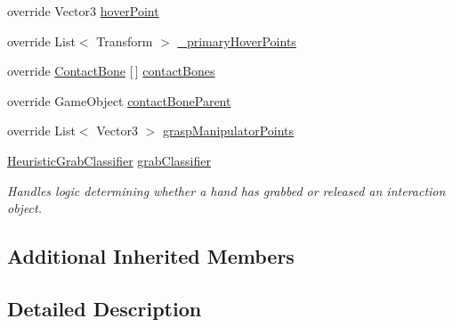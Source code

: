 \begin{DoxyCompactItemize}
override Vector3 \mbox{\hyperlink{class_leap_1_1_unity_1_1_interaction_1_1_interaction_hand_a0f241a7ebea2f55c68666273fe5eda39}{hover\+Point}}
\item 
override List$<$ Transform $>$ \mbox{\hyperlink{class_leap_1_1_unity_1_1_interaction_1_1_interaction_hand_a61394986b5c5dcd7ead304d389e86db7}{\+\_\+primary\+Hover\+Points}}
\item 
override \mbox{\hyperlink{class_leap_1_1_unity_1_1_interaction_1_1_contact_bone}{Contact\+Bone}} \mbox{[}$\,$\mbox{]} \mbox{\hyperlink{class_leap_1_1_unity_1_1_interaction_1_1_interaction_hand_a915151eafdde812438fc5b8f9fe34db8}{contact\+Bones}}
\item 
override Game\+Object \mbox{\hyperlink{class_leap_1_1_unity_1_1_interaction_1_1_interaction_hand_a3cac8a0150d868b76fa631a7518ec575}{contact\+Bone\+Parent}}
\item 
override List$<$ Vector3 $>$ \mbox{\hyperlink{class_leap_1_1_unity_1_1_interaction_1_1_interaction_hand_a2c6bb1acc1d651e8579ab86373e50d3e}{grasp\+Manipulator\+Points}}
\item 
\mbox{\hyperlink{class_leap_1_1_unity_1_1_interaction_1_1_internal_1_1_heuristic_grab_classifier}{Heuristic\+Grab\+Classifier}} \mbox{\hyperlink{class_leap_1_1_unity_1_1_interaction_1_1_interaction_hand_aeb1b0a92a1d62de094c6207a7edbd3e4}{grab\+Classifier}}
\begin{DoxyCompactList}\small\item\em Handles logic determining whether a hand has grabbed or released an interaction object. \end{DoxyCompactList}\end{DoxyCompactItemize}
\subsection*{Additional Inherited Members}


\subsection{Detailed Description}


